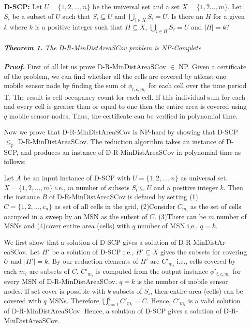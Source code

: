 \textbf{D-SCP:}
Let $U=\{ 1,2,...,n \}$ be the universal set  and a set $X=\{1,2...,m\}$. Let $S_i$ be a subset of  $U$ such that $S_i \subseteq U$ and $\bigcup_{i \in X} S_i=U$. Is there an $H$ for a given $k$ where $k$ is a positive integer such that $H \subseteq X$, $\bigcup_{i \in H} S_i=U$ and $ \mid H \mid = k ? $ 
 \\\\
\textbf{\textit{Theorem 1.}} \textit{The D-R-MinDistAreaSCov problem is NP-Complete}.\\\\
\textbf{\textit{Proof.}} First of all let us prove D-R-MinDistAreaSCov $\in$ NP. Given a certificate of the problem, we can find whether all the cells are covered by atleast one mobile sensor node by finding the sum of $\phi_{t,c,m_i} $ for each cell over the time period T. The result is cell occupancy count for each cell. If this individual sum for each and every  cell is greater than or equal to one then the entire area is covered using $q$ mobile sensor nodes. Thus, the certificate can be verified in polynomial time.

Now we prove that D-R-MinDistAreaSCov is NP-hard by showing that D-SCP $\leq_p$ D-R-MinDistAreaSCov. The reduction algorithm takes an instance of D-SCP, and produces an instance of D-R-MinDistAreaSCov in polynomial time as follows:

Let $A$ be an input instance of D-SCP with $U=\{1,2,...,n\}$ as universal set, $X=\{1,2,...,m\}$ i.e., $m$ number of subsets $S_i \subseteq U$ and a positive integer $k$. Then the instance $B$ of D-R-MinDistAreaSCov is defined by setting (1) $C=\{1,2,...,c_n\}$ as set of all cells in the grid, (2)Consider $C_{m_i}$ as the set of cells occupied in a sweep by an MSN as the subset of $C$. (3)There can be $m$ number of MSNs and (4)cover entire area (cells) with $q$ number of MSN i,e., $q=k$. 

We first show that a solution of  D-SCP  gives  a  solution  of  D-R-MinDistAr- eaSCov. Let $H'$ be a solution of D-SCP i.e., $H' \subseteq X$ gives the subsets for covering $U$ and $\mid H' \mid = k$. By our reduction elements of $H'$ are $C'_{m_i}$ i.e., cells covered by each $m_i$ are subsets of $C$. $C'_{m_i}$ is computed from the output instance $\phi{'}_{t,c,m_i}$ for every MSN of D-R-MinDistAreaSCov. $q = k$ is the number of mobile sensor nodes. If set cover is possible with $k$ subsets of $S_i$, then entire area (cells) can be covered with $q$ MSNs. Therefore $\bigcup_{i=1}^{q} C'_{m_i} = C$. Hence, $C'_{m_i}$ is a valid solution of D-R-MinDistAreaSCov. Hence, a solution of D-SCP gives a solution of D-R-MinDistAreaSCov.

